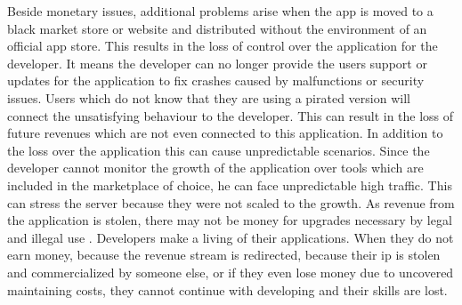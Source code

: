 \newline
Beside monetary issues, additional problems arise when the app is moved to a black market store or website  and distributed without the environment of an official app store.
This results in the loss of control over the application for the developer.
It means the developer can no longer provide the users support or updates for the application to fix crashes caused by malfunctions or security issues.
Users which do not know that they are using a pirated version will connect the unsatisfying behaviour to the developer.
This can result in the loss of future revenues which are not even connected to this application.
In addition to the loss over the application this can cause unpredictable scenarios.
Since the developer cannot monitor the growth of the application over tools which are included in the marketplace of choice, he can face unpredictable high traffic.
This can stress the server because they were not scaled to the growth.
As revenue from the application is stolen, there may not be money for upgrades necessary by legal and illegal use \cite{lierschDeveloperThreats}.
\newline
\newline
Developers make a living of their applications.
When they do not earn money, because the revenue stream is redirected, because their \gls{ip} is stolen and commercialized by someone else, or if they even lose money due to uncovered maintaining costs, they cannot continue with developing and their skills are lost.
